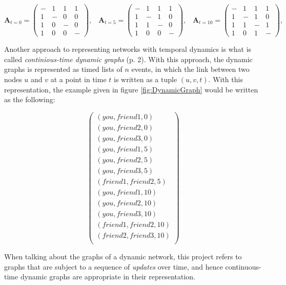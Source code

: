 \begin{equation}
    \textbf{A}_{t=0} = \begin{pmatrix}
                - & 1 & 1 & 1\\
                1 & - & 0 & 0\\
                1 & 0 & - & 0\\
                1 & 0 & 0 & -
                \end{pmatrix}, \hspace{10pt}
    \textbf{A}_{t=5} = \begin{pmatrix}
                - & 1 & 1 & 1\\
                1 & - & 1 & 0\\
                1 & 1 & - & 0\\
                1 & 0 & 0 & -
                \end{pmatrix}, \hspace{10pt}
    \textbf{A}_{t=10} = \begin{pmatrix}
                - & 1 & 1 & 1\\
                1 & - & 1 & 0\\
                1 & 1 & - & 1\\
                1 & 0 & 1 & -
                \end{pmatrix}, \hspace{10pt}
\end{equation}

Another approach to representing networks with temporal dynamics is what is called \textit{continious-time dynamic graphs} \cite{Rossi2020TEMPORALGRAPHS} (p. 2).
With this approach, the dynamic graphs is represented as timed lists of $n$ events, in which the link between two nodes $u$ and $v$ at a point in time $t$ is written as a tuple $(u, v, t)$.
With this representation, the example given in figure \ref{fig:DynamicGraph} would be written as the following:

\begin{equation}
    \begin{pmatrix}
            (you, friend1, 0)\\
            (you, friend2, 0)\\
            (you, friend3, 0)\\
            (you, friend1, 5)\\
            (you, friend2, 5)\\
            (you, friend3, 5)\\
            (friend1, friend2, 5)\\            
            (you, friend1, 10)\\
            (you, friend2, 10)\\
            (you, friend3, 10)\\
            (friend1, friend2, 10)\\
            (friend2, friend3, 10)\\
            \end{pmatrix}
\end{equation}

When talking about the graphs of a dynamic network, this project refers to graphs that are subject to a sequence of \textit{updates} over time, and hence continuous-time dynamic graphs are appropriate in their representation. 





